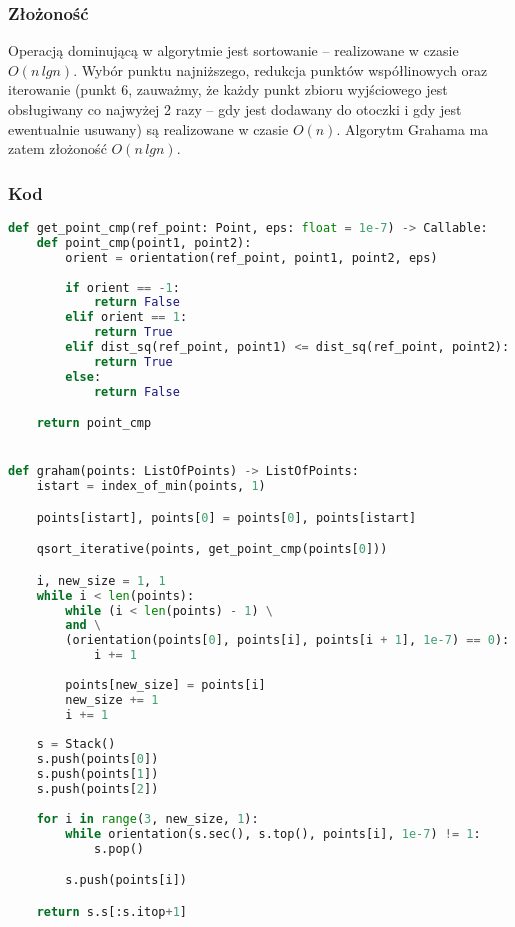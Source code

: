 \documentclass[11pt]{article}
\theoremstyle{remark} \newtheorem{definition}{def.}
\theoremstyle{definition} \newtheorem{twierdzenie}{tw.}
\begin{document}
    \subsubsection{Złożoność}
    
    Operacją dominującą w algorytmie jest sortowanie -- realizowane w czasie $O(n \, lgn)$. Wybór punktu najniższego, redukcja punktów współlinowych oraz iterowanie (punkt 6, 
    zauważmy, że każdy punkt zbioru wyjściowego jest obsługiwany co najwyżej 2 razy -- gdy jest dodawany do otoczki i gdy jest ewentualnie usuwany) są realizowane w
    czasie $O(n)$. Algorytm Grahama ma zatem złożoność $O(n \, lgn)$.


    \subsubsection{Kod}


    \begin{lstlisting}[language=Python]
def get_point_cmp(ref_point: Point, eps: float = 1e-7) -> Callable:
    def point_cmp(point1, point2):
        orient = orientation(ref_point, point1, point2, eps)
        
        if orient == -1:
            return False
        elif orient == 1:
            return True
        elif dist_sq(ref_point, point1) <= dist_sq(ref_point, point2):
            return True
        else:
            return False

    return point_cmp


def graham(points: ListOfPoints) -> ListOfPoints:
    istart = index_of_min(points, 1)

    points[istart], points[0] = points[0], points[istart]    

    qsort_iterative(points, get_point_cmp(points[0]))

    i, new_size = 1, 1
    while i < len(points):
        while (i < len(points) - 1) \
        and \
        (orientation(points[0], points[i], points[i + 1], 1e-7) == 0):  
            i += 1
        
        points[new_size] = points[i]
        new_size += 1
        i += 1
    
    s = Stack()
    s.push(points[0])
    s.push(points[1])
    s.push(points[2])
    
    for i in range(3, new_size, 1):
        while orientation(s.sec(), s.top(), points[i], 1e-7) != 1:
            s.pop()

        s.push(points[i])

    return s.s[:s.itop+1]
    \end{lstlisting}
\end{document}
